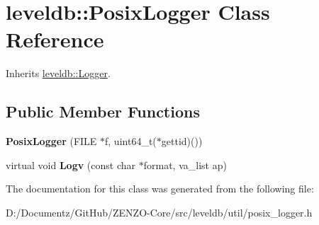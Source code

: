 \hypertarget{classleveldb_1_1_posix_logger}{}\section{leveldb\+::Posix\+Logger Class Reference}
\label{classleveldb_1_1_posix_logger}


Inherits \mbox{\hyperlink{classleveldb_1_1_logger}{leveldb\+::\+Logger}}.

\subsection*{Public Member Functions}
\begin{DoxyCompactItemize}
\item 
\mbox{\label{classleveldb_1_1_posix_logger_a9c498babc43c3cfb5f863a252ce5d1d1}} 
{\bfseries Posix\+Logger} (F\+I\+LE $\ast$f, uint64\+\_\+t($\ast$gettid)())
\item 
\mbox{\label{classleveldb_1_1_posix_logger_ae7b521716a3e54c4be187806a81ccf6b}} 
virtual void {\bfseries Logv} (const char $\ast$format, va\+\_\+list ap)
\end{DoxyCompactItemize}


The documentation for this class was generated from the following file\+:\begin{DoxyCompactItemize}
\item 
D\+:/\+Documentz/\+Git\+Hub/\+Z\+E\+N\+Z\+O-\/\+Core/src/leveldb/util/posix\+\_\+logger.\+h\end{DoxyCompactItemize}
